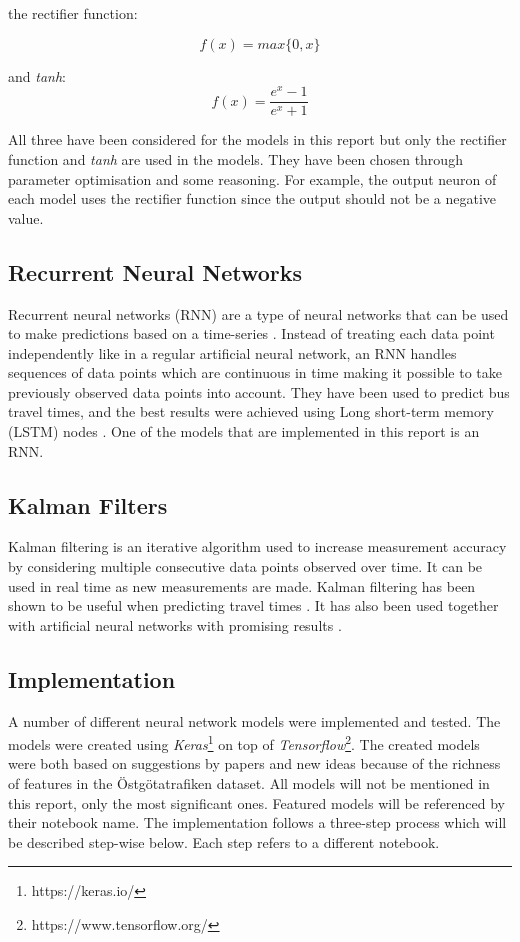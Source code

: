 the rectifier function:

\begin{equation} 
    f(x) = max\{0,x\}
\end{equation}

and \textit{tanh}:
\begin{equation} 
    f(x) =  \frac{e^x-1}{e^{x}+1} 
\end{equation}

All three have been considered for the models in this report but only the rectifier function and \textit{tanh} are used in the models. They have been chosen through parameter optimisation and some reasoning. For example, the output neuron of each model uses the rectifier function since the output should not be a negative value.

\subsection{Recurrent Neural Networks}
Recurrent neural networks (RNN) are a type of neural networks that can be used to make predictions based on a time-series \cite{RNN}. Instead of treating each data point independently like in a regular artificial neural network, an RNN handles sequences of data points which are continuous in time making it possible to take previously observed data points into account. They have been used to predict bus travel times, and the best results were achieved using Long short-term memory (LSTM) nodes \cite{RNNBusPredictions}. One of the models that are implemented in this report is an RNN. 

\subsection{Kalman Filters}
Kalman filtering is an iterative algorithm used to increase measurement accuracy by considering multiple consecutive data points observed over time. It can be used in real time as new measurements are made. Kalman filtering has been shown to be useful when predicting travel times \cite{kalmanPrediction, brazilANN}. It has also been used together with artificial neural networks with promising results \cite{kalmanANN}.

\subsection{Implementation}
A number of different neural network models were implemented and tested. The models were created using \textit{Keras}\footnote{https://keras.io/} on top of \textit{Tensorflow}\footnote{https://www.tensorflow.org/}. The created models were both based on suggestions by papers and new ideas because of the richness of features in the Östgötatrafiken dataset. All models will not be mentioned in this report, only the most significant ones. Featured models will be referenced by their notebook name. The implementation follows a three-step process which will be described step-wise below. Each step refers to a different notebook.

